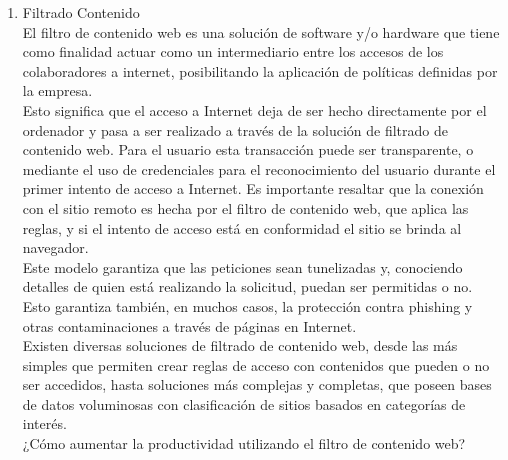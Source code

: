 \documentclass[preprint,12pt]{elsarticle}
\begin{document}
\begin{enumerate}[5.1]
    \item Filtrado Contenido \\

El filtro de contenido web es una solución de software y/o hardware que tiene como finalidad actuar como un intermediario entre los accesos de los colaboradores a internet, posibilitando la aplicación de políticas definidas por la empresa.\\

Esto significa que el acceso a Internet deja de ser hecho directamente por el ordenador y pasa a ser realizado a través de la solución de filtrado de contenido web. Para el usuario esta transacción puede ser transparente, o mediante el uso de credenciales para el reconocimiento del usuario durante el primer intento de acceso a Internet. Es importante resaltar que la conexión con el sitio remoto es hecha por el filtro de contenido web, que aplica las reglas, y si el intento de acceso está en conformidad el sitio se brinda al navegador.\\

Este modelo garantiza que las peticiones sean tunelizadas y, conociendo detalles de quien está realizando la solicitud, puedan ser permitidas o no. Esto garantiza también, en muchos casos, la protección contra phishing y otras contaminaciones a través de páginas en Internet.\\

Existen diversas soluciones de filtrado de contenido web, desde las más simples que permiten crear reglas de acceso con contenidos que pueden o no ser accedidos, hasta soluciones más complejas y completas, que poseen bases de datos voluminosas con clasificación de sitios basados en categorías de interés.\\

¿Cómo aumentar la productividad utilizando el filtro de contenido web?\\


\end{enumerate}
\end{document}
